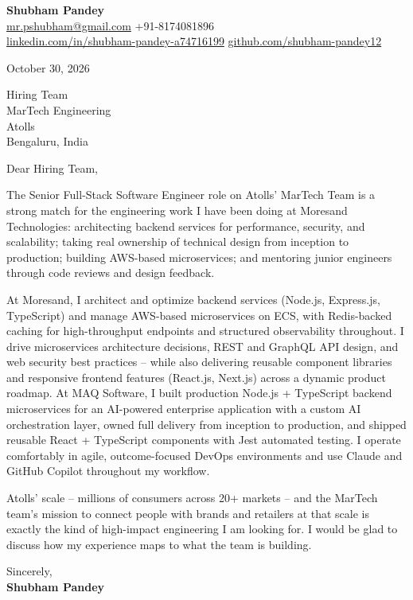 \documentclass[a4paper,11pt]{article}
\begin{document}
\textbf{\Large Shubham Pandey}\\
\href{mailto:mr.pshubham@gmail.com}{mr.pshubham@gmail.com} \quad +91-8174081896\\
\href{https://www.linkedin.com/in/shubham-pandey-a74716199/}{linkedin.com/in/shubham-pandey-a74716199} \quad
\href{https://github.com/shubham-pandey12}{github.com/shubham-pandey12}

\vspace{1em}
October 30, 2026

\vspace{1em}
Hiring Team\\
MarTech Engineering\\
Atolls\\
Bengaluru, India

\vspace{1em}
Dear Hiring Team,

The Senior Full-Stack Software Engineer role on Atolls' MarTech Team is a strong match for the engineering work I have been doing at Moresand Technologies: architecting backend services for performance, security, and scalability; taking real ownership of technical design from inception to production; building AWS-based microservices; and mentoring junior engineers through code reviews and design feedback.

At Moresand, I architect and optimize backend services (Node.js, Express.js, TypeScript) and manage AWS-based microservices on ECS, with Redis-backed caching for high-throughput endpoints and structured observability throughout. I drive microservices architecture decisions, REST and GraphQL API design, and web security best practices -- while also delivering reusable component libraries and responsive frontend features (React.js, Next.js) across a dynamic product roadmap. At MAQ Software, I built production Node.js + TypeScript backend microservices for an AI-powered enterprise application with a custom AI orchestration layer, owned full delivery from inception to production, and shipped reusable React + TypeScript components with Jest automated testing. I operate comfortably in agile, outcome-focused DevOps environments and use Claude and GitHub Copilot throughout my workflow.

Atolls' scale -- millions of consumers across 20+ markets -- and the MarTech team's mission to connect people with brands and retailers at that scale is exactly the kind of high-impact engineering I am looking for. I would be glad to discuss how my experience maps to what the team is building.

\vspace{1em}
Sincerely,\\[0.5em]
\textbf{Shubham Pandey}
\end{document}
